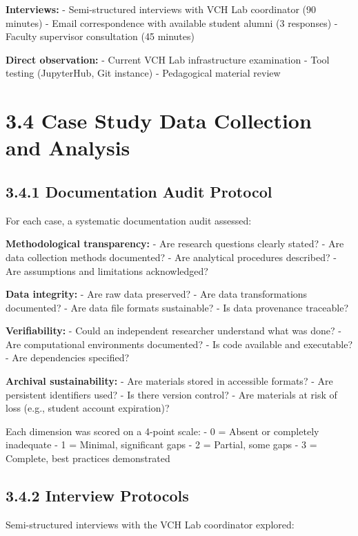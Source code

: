 \documentclass[
  oneside,
  open=any]{scrbook}
\begin{document}
\textbf{Interviews:} - Semi-structured interviews with VCH Lab
coordinator (90 minutes) - Email correspondence with available student
alumni (3 responses) - Faculty supervisor consultation (45 minutes)

\textbf{Direct observation:} - Current VCH Lab infrastructure
examination - Tool testing (JupyterHub, Git instance) - Pedagogical
material review

\section{3.4 Case Study Data Collection and
Analysis}\label{case-study-data-collection-and-analysis}

\subsection{3.4.1 Documentation Audit
Protocol}\label{documentation-audit-protocol}

For each case, a systematic documentation audit assessed:

\textbf{Methodological transparency:} - Are research questions clearly
stated? - Are data collection methods documented? - Are analytical
procedures described? - Are assumptions and limitations acknowledged?

\textbf{Data integrity:} - Are raw data preserved? - Are data
transformations documented? - Are data file formats sustainable? - Is
data provenance traceable?

\textbf{Verifiability:} - Could an independent researcher understand
what was done? - Are computational environments documented? - Is code
available and executable? - Are dependencies specified?

\textbf{Archival sustainability:} - Are materials stored in accessible
formats? - Are persistent identifiers used? - Is there version control?
- Are materials at risk of loss (e.g., student account expiration)?

Each dimension was scored on a 4-point scale: - 0 = Absent or completely
inadequate - 1 = Minimal, significant gaps - 2 = Partial, some gaps - 3
= Complete, best practices demonstrated

\subsection{3.4.2 Interview Protocols}\label{interview-protocols}

Semi-structured interviews with the VCH Lab coordinator explored:
\end{document}
